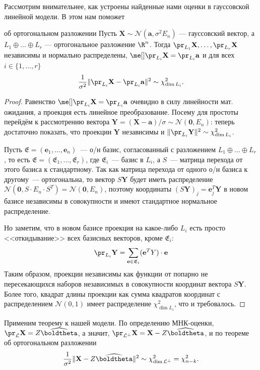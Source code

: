 Рассмотрим внимательнее, как устроены найденные нами оценки в гауссовской линейной модели. В этом нам поможет

\begin{theorem}{об ортогональном разложении}{}
Пусть $\mathbf X \sim \mathcal{N}(\mathbf a, \sigma^2 E_n)$ --- гауссовский вектор, а $L_1 \oplus \ldots \oplus L_r$ --- ортогональное разложение $\R^n$. Тогда $\pr_{L_1} \mathbf X, \ldots, \pr_{L_r} \mathbf X$ независимы и нормально распределены, $\me[] \pr_{L_i} \mathbf X = \pr_{L_i} \mathbf a$ и для всех $i\in\{1, \ldots, r\}$
\[
\frac{1}{\sigma^2} \|\pr_{L_i} \mathbf X - \pr_{L_i} \mathbf a\|^2 \sim \chi^2_{\dim{L_i}}.
\]
\end{theorem}

\begin{proof}
Равенство $\me[] \pr_{L_i} \mathbf X = \pr_{L_i} \mathbf a$ очевидно в силу линейности мат. ожидания, а проекция есть линейное преобразование. Посему для простоты перейдём к рассмотрению вектора $\mathbf Y = (\mathbf X - \mathbf a) / \sigma \sim \mathcal{N}(\mathbf 0, E_n)$: теперь достаточно показать, что проекции $\mathbf Y$ независимы и $\|\pr_{L_i}\mathbf Y\|^2 \sim \chi^2_{\dim L_i}$.

Пусть $\mathfrak{E} = (\mathbf e_1, \ldots, \mathbf e_n)$~--- о/н базис, согласованный с разложением $L_1 \oplus \ldots \oplus L_r$, то есть $\mathfrak{E} = (\mathfrak{E}_1, \ldots, \mathfrak{E}_r)$, где $\mathfrak{E}_i$~--- базис в $L_i$, а $S$~--- матрица перехода от этого базиса к стандартному. Так как матрица перехода от одного о/н базиса к другому~--- ортогональна, то вектор $S\mathbf Y$ будет иметь распределение $\mathcal{N}(\mathbf 0, S\cdot E_n \cdot S^T) = \mathcal{N}(\mathbf 0, E_n)$, поэтому координаты $(S\mathbf Y)_j = \mathbf e_j^T \mathbf Y$ в новом базисе независимы в совокупности и имеют стандартное нормальное распределение.

Но заметим, что в новом базисе проекция на какое-либо $L_i$ есть просто <<откидывание>> всех базисных векторов, кроме $\mathfrak{E}_i$:
\[
\pr_{L_i} \mathbf Y = \sum_{\mathbf e \in \mathfrak{E_i}} (\mathbf e^T Y) \cdot \mathbf e
\]
Таким образом, проекции независимы как функции от попарно не пересекающихся наборов независимых в совокупности координат вектора $S\mathbf Y$. Более того, квадрат длины проекции как сумма квадратов координат с распределением $\mathcal{N}(0, 1)$ имеет распределение $\chi^2_{\dim L_i}$, что и требовалось.
\end{proof}

Применим теорему к нашей модели. По определению МНК-оценки, $\pr_{\mathcal{L}} \mathbf X = Z\widehat{\boldtheta}$, а значит, $\pr_{\mathcal{L}^{\bot}} \mathbf X = \mathbf X - Z\widehat{\boldtheta}$, и по теореме об ортогональном разложении
\begin{equation}\label{chi_nk}
    \frac{1}{\sigma^2} \|\mathbf X - Z\widehat{\boldtheta}\|^2 \sim \chi^2_{\dim{\mathcal{L}^{\bot}}} = \chi^2_{n - k}.
\end{equation}

